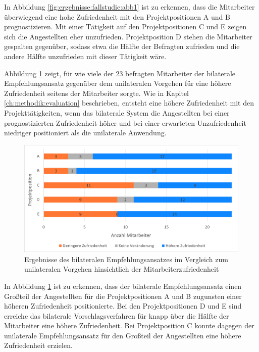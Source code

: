 In Abbildung \ref{fig:ergebnisse:fallstudie:abb1} ist zu erkennen, dass die Mitarbeiter überwiegend eine hohe Zufriedenheit mit den Projektpositionen A und B prognostizieren. Mit einer Tätigkeit auf den Projektpositionen C und E zeigen sich die Angestellten eher unzufrieden. Projektposition D stehen die Mitarbeiter gespalten gegenüber, sodass etwa die Hälfte der Befragten zufrieden und die andere Hälfte unzufrieden mit dieser Tätigkeit wäre.

Abbildung \ref{fig:ergebnisse:analyse:abb7} zeigt, für wie viele der 23 befragten Mitarbeiter der bilaterale Empfehlungsansatz gegenüber dem unilateralen Vorgehen für eine höhere Zufriedenheit seitens der Mitarbeiter sorgte. Wie in Kapitel \ref{ch:methodik:evaluation} beschrieben, entsteht eine höhere Zufriedenheit mit den Projekttätigkeiten, wenn das bilaterale System die Angestellten bei einer prognostizierten Zufriedenheit höher und bei einer erwarteten Unzufriedenheit niedriger positioniert als die unilaterale Anwendung.

\begin{figure}[h]
	\centering
	\includegraphics[width=1\textwidth]{gfx/zufriedenheit-projekte.png}	
	\caption{Ergebnisse des bilateralen Empfehlungsansatzes im Vergleich zum unilateralen Vorgehen hinsichtlich der Mitarbeiterzufriedenheit}
	\label{fig:ergebnisse:analyse:abb7}
\end{figure}

In Abbildung \ref{fig:ergebnisse:analyse:abb7} ist zu erkennen, dass der bilaterale Empfehlungsansatz einen Großteil der Angestellten für die Projektpositionen A und B zugunsten einer höheren Zufriedenheit positionierte. Bei den Projektpositionen D und E sind erreiche das bilaterale Vorschlagsverfahren für knapp über die Hälfte der Mitarbeiter eine höhere Zufriedenheit. Bei Projektposition C konnte dagegen der unilaterale Empfehlungsansatz für den Großteil der Angestellten eine höhere Zufriedenheit erzielen.


